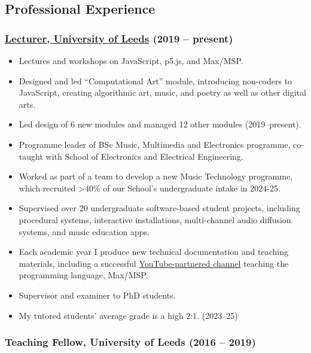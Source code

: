 \documentclass[10pt,a4paper]{article}
\providecommand{\tightlist}{%
  \setlength{\itemsep}{0pt}\setlength{\parskip}{0pt}}
\begin{document}
\subsection{Professional Experience}\label{professional-experience}

\subsubsection{\texorpdfstring{\href{https://ahc.leeds.ac.uk/music/staff/488/dr-oliver-thurley}{Lecturer,
University of Leeds} (2019 --
present)}{Lecturer, University of Leeds (2019 -- present)}}\label{lecturer-university-of-leeds-2019-present}

\begin{itemize}
\tightlist
\item
  Lectures and workshops on JavaScript, p5.js, and Max/MSP.
\item
  Designed and led ``Computational Art'' module, introducing non-coders
  to JavaScript, creating algorithmic art, music, and poetry as well as
  other digital arts.
\item
  Led design of 6 new modules and managed 12 other modules
  (2019--present).
\item
  Programme leader of BSc Music, Multimedia and Electronics programme,
  co-taught with School of Electronics and Electrical Engineering.
\item
  Worked as part of a team to develop a new Music Technology programme,
  which recruited \textgreater40\% of our School's undergraduate intake
  in 2024-25.
\item
  Supervised over 20 undergraduate software-based student projects,
  including procedural systems, interactive installations, multi-channel
  audio diffusion systems, and music education apps.
\item
  Each academic year I produce new technical documentation and teaching
  materials, including a successful
  \href{https://www.youtube.com/@thrly}{YouTube-partnered channel}
  teaching the programming language, Max/MSP.
\item
  Supervisor and examiner to PhD students.
\item
  My tutored students' average grade is a high 2:1. (2023--25)
\end{itemize}

\subsubsection{Teaching Fellow, University of Leeds (2016 --
2019)}\label{teaching-fellow-university-of-leeds-2016-2019}
\end{document}
